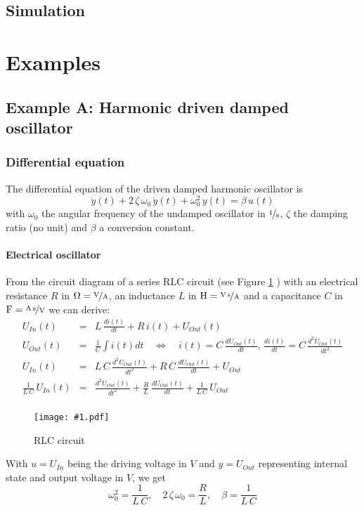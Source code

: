\documentclass[a4paper,12pt]{article}
\newcommand{\Fig}[3]{%
	\begin{figure}[htb]%
	\begin{center}%
	\texttt{[image: \#1.pdf]}%
	\end{center}%
	\caption{#3\label{fig:#1}}%
	\end{figure}%
	}
\newcommand{\FigRef}[1]{%
	Figure \ref{fig:#1}%
	}
\newcommand{\pfrac}[2]{\frac{#1}{#2}}
\newcommand{\Section}[2]{\section{#2}\label{section:#1}}
\newcommand{\SubSection}[2]{\subsection{#2}\label{subsection:#1}}
\newcommand{\SubSubSection}[2]{\subsubsection{#2}\label{subsubsection:#1}}
\begin{document}
\SubSection{simu}{Simulation}






\Section{examples}{Examples}

\SubSection{oscillator}{Example A: Harmonic driven damped oscillator}

\SubSubSection{diffeqA}{Differential equation}

The differential equation of the driven damped harmonic oscillator is
\begin{equation}
\ddot{y}(t)+2\,\zeta\,\omega_0\,\dot{y}(t)+\omega_0^2\,y(t)=\beta\,u(t)
\end{equation}
with $\omega_0$ the angular frequency of the undamped oscillator in
$\unitfrac{1}{s}$, $\zeta$ the damping ratio (no unit) and $\beta$ a
conversion constant.\\

\paragraph{Electrical oscillator}

From the circuit diagram of a series RLC circuit (see \FigRef{elecoscil}) with
an electrical resistance $R$ in $\unit{\Omega}=\unitfrac{V}{A}$, an inductance
$L$ in $\unit{H}=\unitfrac{V\,s}{A}$ and a capacitance $C$ in
$\unit{F}=\unitfrac{A\,s}{V}$ we can derive:
\begin{eqnarray}
U_{In}(t)&=&L\,\frac{di(t)}{dt}+R\,i(t)+U_{Out}(t)\\
U_{Out}(t)&=&\frac{1}{C}\int i(t)dt\quad\Leftrightarrow\quad i(t)=C\,\frac{dU_{Out}(t)}{dt},\,\frac{di(t)}{dt}=C\,\frac{d^2U_{Out}(t)}{dt^2}\\
U_{In}(t)&=&L\,C\,\frac{d^2U_{Out}(t)}{dt^2}+R\,C\,\frac{dU_{Out}(t)}{dt}+U_{Out}\\
\frac{1}{L\,C}\,U_{In}(t)&=&\frac{d^2U_{Out}(t)}{dt^2}+\frac{R}{L}\,\frac{dU_{Out}(t)}{dt}+\frac{1}{L\,C}\,U_{Out}\\
\end{eqnarray}

\Fig{elecoscil}{0.5}{RLC circuit}

With $u=U_{In}$ being the driving voltage in $\unit{V}$ and $y=U_{Out}$
representing internal state and output voltage in $\unit{V}$, we get
\begin{equation}
\omega_0^2=\pfrac{1}{L\,C},\quad2\,\zeta\,\omega_0=\pfrac{R}{L},\quad\beta=\pfrac{1}{L\,C}
\end{equation}
\end{document}
